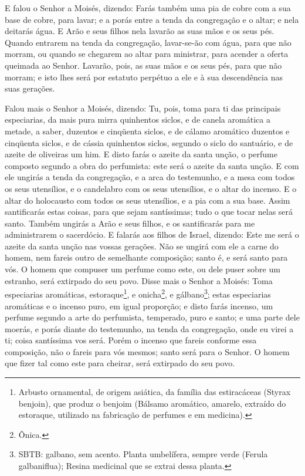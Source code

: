 E falou o Senhor a Moisés, dizendo: Farás também uma pia
de cobre com a sua base de cobre, para lavar; e a porás entre a
tenda da congregação e o altar; e nela deitarás água. E Arão
e seus filhos nela lavarão as suas mãos e os seus pés. Quando
entrarem na tenda da congregação, lavar-se-ão com água, para que não
morram, ou quando se chegarem ao altar para ministrar, para acender
a oferta queimada ao Senhor. Lavarão, pois, as suas mãos e os
seus pés, para que não morram; e isto lhes será por estatuto
perpétuo a ele e à sua descendência nas suas gerações.

Falou mais o Senhor a Moisés, dizendo: Tu, pois, toma para
ti das principais especiarias, da mais pura mirra quinhentos siclos,
e de canela aromática a metade, a saber, duzentos e cinqüenta
siclos, e de cálamo aromático duzentos e cinqüenta siclos, e
de cássia quinhentos siclos, segundo o siclo do santuário, e de
azeite de oliveiras um him. E disto farás o azeite da santa
unção, o perfume composto segundo a obra do perfumista: este será o
azeite da santa unção. E com ele ungirás a tenda da
congregação, e a arca do testemunho, e a mesa com todos os
seus utensílios, e o candelabro com os seus utensílios, e o altar do
incenso. E o altar do holocausto com todos os seus
utensílios, e a pia com a sua base. Assim santificarás estas
coisas, para que sejam santíssimas; tudo o que tocar nelas será
santo. Também ungirás a Arão e seus filhos, e os santificarás
para me administrarem o sacerdócio. E falarás aos filhos de
Israel, dizendo: Este me será o azeite da santa unção nas vossas
gerações. Não se ungirá com ele a carne do homem, nem fareis
outro de semelhante composição; santo é, e será santo para vós.
O homem que compuser um perfume como este, ou dele puser
sobre um estranho, será extirpado do seu povo. Disse mais o
Senhor a Moisés: Toma especiarias aromáticas,
estoraque\footnote{Arbusto ornamental, de origem asiática, da
família das estiracáceas (Styrax benjoin), que produz o benjoim
(Bálsamo aromático, amarelo, extraído do estoraque, utilizado na
fabricação de perfumes e em medicina).}, e onicha\footnote{Ônica.},
e gálbano\footnote{SBTB: galbano, sem acento. Planta umbelífera,
sempre verde (Ferula galbaniflua); Resina medicinal que se extrai
dessa planta.}; estas especiarias aromáticas e o incenso puro, em
igual proporção; e disto farás incenso, um perfume segundo a
arte do perfumista, temperado, puro e santo; e uma parte dele
moerás, e porás diante do testemunho, na tenda da congregação, onde
eu virei a ti; coisa santíssima vos será. Porém o incenso que
fareis conforme essa composição, não o fareis para vós mesmos; santo
será para o Senhor. O homem que fizer tal como este para
cheirar, será extirpado do seu povo.

